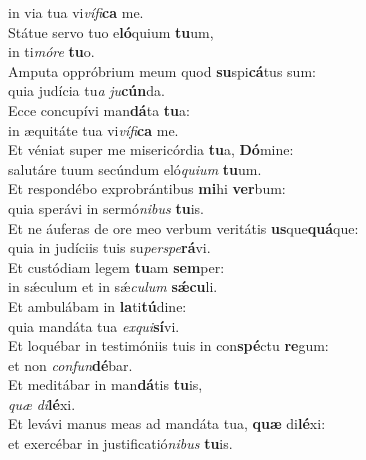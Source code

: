 \oddverse in via tua vi\textit{ví}\textit{fi}\textbf{ca} me.\\
\evenverse Státue servo tuo e\textbf{ló}quium \textbf{tu}um,~\*\\
\evenverse in ti\textit{mó}\textit{re} \textbf{tu}o.\\
\oddverse Amputa oppróbrium meum quod \textbf{su}spi\textbf{cá}tus sum:~\*\\
\oddverse quia judícia tu\textit{a} \textit{ju}\textbf{cún}da.\\
\evenverse Ecce concupívi man\textbf{dá}ta \textbf{tu}a:~\*\\
\evenverse in æquitáte tua vi\textit{ví}\textit{fi}\textbf{ca} me.\\
\oddverse Et véniat super me misericórdia \textbf{tu}a, \textbf{Dó}mine:~\*\\
\oddverse salutáre tuum secúndum eló\textit{qui}\textit{um} \textbf{tu}um.\\
\evenverse Et respondébo exprobrántibus \textbf{mi}hi \textbf{ver}bum:~\*\\
\evenverse quia sperávi in sermó\textit{ni}\textit{bus} \textbf{tu}is.\\
\oddverse Et ne áuferas de ore meo verbum veritátis \textbf{us}que\textbf{quá}que:~\*\\
\oddverse quia in judíciis tuis su\textit{per}\textit{spe}\textbf{rá}vi.\\
\evenverse Et custódiam legem \textbf{tu}am \textbf{sem}per:~\*\\
\evenverse in sǽculum et in sǽ\textit{cu}\textit{lum} \textbf{sǽ}\textbf{cu}li.\\
\oddverse Et ambulábam in \textbf{la}ti\textbf{tú}dine:~\*\\
\oddverse quia mandáta tua \textit{ex}\textit{qui}\textbf{sí}vi.\\
\evenverse Et loquébar in testimóniis tuis in con\textbf{spé}ctu \textbf{re}gum:~\*\\
\evenverse et non \textit{con}\textit{fun}\textbf{dé}bar.\\
\oddverse Et meditábar in man\textbf{dá}tis \textbf{tu}is,~\*\\
\oddverse \textit{quæ} \textit{di}\textbf{lé}xi.\\
\evenverse Et levávi manus meas ad mandáta tua, \textbf{quæ} di\textbf{lé}xi:~\*\\
\evenverse et exercébar in justificatió\textit{ni}\textit{bus} \textbf{tu}is.\\
